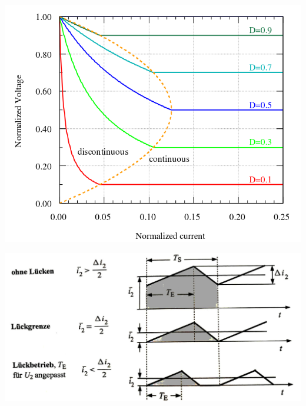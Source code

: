 \begin{minipage}{0.4\linewidth}
    \includegraphics[width=\linewidth]{images/BuckLueckGrenze}
\end{minipage}
\begin{minipage}{0.6\linewidth}
    \includegraphics[width=\linewidth]{images/BuckLueckBetrieb}
\end{minipage}
\clearpage

